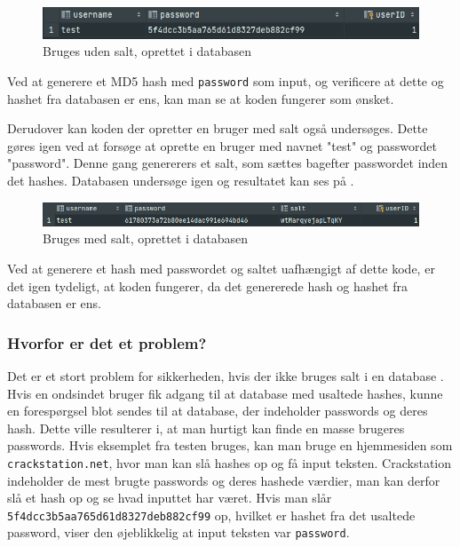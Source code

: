 \documentclass[12pt]{article}
\begin{document}
\begin{figure}[h]
\includegraphics[width=1\linewidth]{no-salt.png} 
\centering
\caption{Bruges uden salt, oprettet i databasen}
\label{fig:no-salt}
\end{figure}

Ved at generere et MD5 hash med \verb|password| som input, og verificere at dette og hashet fra databasen er ens, kan man se at koden fungerer som ønsket. 

Derudover kan koden der opretter en bruger med salt også undersøges. Dette gøres igen ved at forsøge at oprette en bruger med navnet "test" og passwordet "password". Denne gang genererers et salt, som sættes bagefter passwordet inden det hashes. Databasen undersøge igen og resultatet kan ses på \figureautorefname{~\ref{fig:with-salt}}.

\begin{figure}[h]
\includegraphics[width=1\linewidth]{with-salt.png} 
\centering
\caption{Bruges med salt, oprettet i databasen}
\label{fig:with-salt}
\end{figure}


Ved at generere et hash med passwordet og saltet uafhængigt af dette kode, er det igen tydeligt, at koden fungerer, da det genererede hash og hashet fra databasen er ens. 


\subsubsection{Hvorfor er det et problem?}
Det er et stort problem for sikkerheden, hvis der ikke bruges salt i en database \cite{noauthor_adding_nodate}. Hvis en ondsindet bruger fik adgang til at database med usaltede hashes, kunne en forespørgsel blot sendes til at database, der indeholder passwords og deres hash. Dette ville resulterer i, at man hurtigt kan finde en masse brugeres passwords. Hvis eksemplet fra testen bruges, kan man bruge en hjemmesiden som \verb|crackstation.net|, hvor man kan slå hashes op og få input teksten. Crackstation indeholder de mest brugte passwords og deres hashede værdier, man kan derfor slå et hash op og se hvad inputtet har været. Hvis man slår \verb|5f4dcc3b5aa765d61d8327deb882cf99| op, hvilket er hashet fra det usaltede password, viser den øjeblikkelig at input teksten var \verb|password|. 
\end{document}
